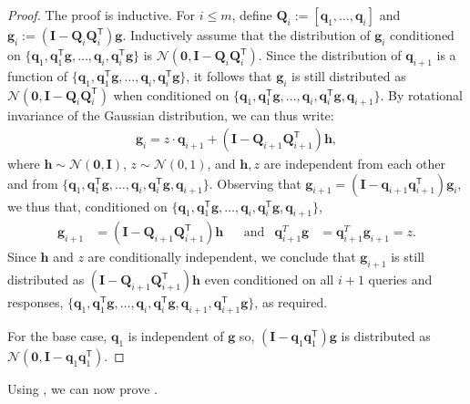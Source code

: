 \documentclass{article}[11pt]
\theoremstyle{definition}
\newcommand{\bv}[1]{\boldsymbol{\mathbf{#1}}}
\newcommand{\T}{\mathsf{T}}
\newcommand{\transpose}{\mathsf{T}}
\begin{document}
\begin{proof}
The proof is inductive. For $i \leq m$, define $\bv{Q}_i := [\bv{q}_1, \ldots, \bv{q}_i]$ and $\bv{g}_i := (\bv{I} - \bv{Q}_i\bv{Q}_i^\transpose)\bv{g}$. 
Inductively assume that the distribution of $\bv{g}_i$ conditioned on 
$\{\bv{q}_1, \bv{q}_1^\transpose \bv{g}, \ldots, \bv{q}_{i}, \bv{q}_{i}^\transpose \bv{g}\}$ is $\mathcal{N}(\bv{0}, \bv{I} - \bv{Q}_i\bv{Q}_i^\transpose)$.
Since the distribution of $\bv{q}_{i+1}$ is a function of $\{\bv{q}_1, \bv{q}_1^\transpose \bv{g}, \ldots, \bv{q}_{i}, \bv{q}_{i}^\transpose \bv{g}\}$, it follows that $\bv{g}_i$ is still distributed as $\mathcal{N}(\bv{0}, \bv{I} - \bv{Q}_i\bv{Q}_i^\transpose)$ when conditioned on $\{\bv{q}_1, \bv{q}_1^\transpose \bv{g}, \ldots, \bv{q}_{i}, \bv{q}_{i}^\transpose \bv{g}, \bv{q}_{i+1}\}$. 
%
By rotational invariance of the Gaussian distribution, we can thus write:
\begin{align*}
\bv{g}_i = z\cdot \bv{q}_{i+1} + (\bv{I} - \bv{Q}_{i+1}\bv{Q}_{i+1}^\transpose)\bv{h}, 
\end{align*}
where $\bv{h} \sim\mathcal{N}(\bv{0}, \bv{I})$, $z \sim \mathcal{N}(0,1)$, and $\bv{h}, z$ are independent from each other and from $\{\bv q_1, \bv q_1^\transpose \bv g, \ldots, \bv q_i, \bv q_i^\transpose \bv g, \bv q_{i+1}\}$.
Observing that $\bv{g}_{i+1} = (\bv{I}-\bv{q}_{i+1}\bv{q}_{i+1}^\transpose)\bv{g}_i$, we thus that, conditioned on $\{\bv{q}_1, \bv{q}_1^\transpose \bv{g}, \ldots, \bv{q}_{i}, \bv{q}_{i}^\transpose \bv{g}, \bv{q}_{i+1}\}$,
\begin{align*}
\bv{g}_{i+1} &= (\bv I - \bv Q_{i+1} \bv Q_{i+1}^\T)\bv{h} & &\text{and} & \bv{q}_{i+1}^T\bv{g} &= \bv{q}_{i+1}^T\bv{g}_{i+1} = z.
\end{align*}
Since $\bv{h}$ and $z$ are conditionally independent, we conclude that $\bv{g}_{i+1}$ is still distributed as $(\bv{I} - \bv{Q}_{i+1}\bv{Q}_{i+1}^\transpose) \bv{h}$ even conditioned on all $i+1$ queries and responses, $\{\bv{q}_1, \bv{q}_1^\transpose \bv{g}, \ldots, \bv{q}_{i}, \bv{q}_{i}^\transpose \bv{g}, \bv{q}_{i+1}, \bv{q}_{i+1}^\T\bv{g}\}$, as required.

For the base case, $\bv{q}_1$ is independent of $\bv{g}$ so, $(\bv{I} -\bv{q}_1\bv{q}_1^\transpose)\bv{g}$ is distributed as $\mathcal{N}(\bv{0}, \bv{I} - \bv{q}_1\bv{q}_1^\transpose)$. 
\end{proof}

Using , we can now prove .
\end{document}
